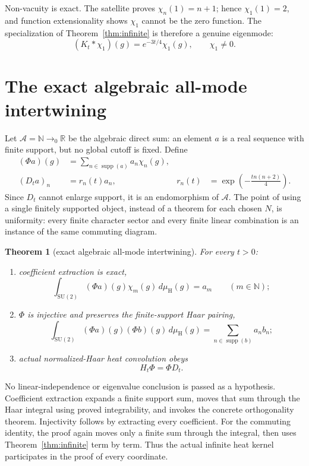 \documentclass[11pt]{article}
\newtheorem{theorem}{Theorem}[section]
\theoremstyle{definition}
\theoremstyle{remark}
\newcommand{\SU}{\mathrm{SU}(2)}
\newcommand{\Haar}{\mu_{\mathrm H}}
\begin{document}
Non-vacuity is exact.  The satellite proves $\chi_n(1)=n+1$; hence
$\chi_1(1)=2$, and function extensionality shows $\chi_1$ cannot be the zero
function.  The specialization of Theorem~\ref{thm:infinite} is therefore a
genuine eigenmode:
\begin{equation}\label{eq:fundamental}
  (K_t*\chi_1)(g)=e^{-3t/4}\chi_1(g),\qquad \chi_1\ne0.
\end{equation}

\section{The exact algebraic all-mode intertwining}\label{sec:intertwining}

Let $\mathcal A=\mathbb N\to_0\mathbb R$ be the algebraic direct sum: an
element $a$ is a real sequence with finite support, but no global cutoff is
fixed.  Define
\begin{align*}
  (\Phi a)(g)&=\sum_{n\in\operatorname{supp}(a)}a_n\chi_n(g),\\
  (D_ta)_n&=r_n(t)a_n,
  &r_n(t)&=\exp\!\left(-\frac{t n(n+2)}4\right).
\end{align*}
Since $D_t$ cannot enlarge support, it is an endomorphism of $\mathcal A$.
The point of using a single finitely supported object, instead of a theorem
for each chosen $N$, is uniformity: every finite character sector and every
finite linear combination is an instance of the same commuting diagram.

\begin{theorem}[exact algebraic all-mode intertwining]\label{thm:allmodes}
For every $t>0$:
\begin{enumerate}[label=(\alph*)]
\item coefficient extraction is exact,
\[
 \int_{\SU}(\Phi a)(g)\chi_m(g)\,d\Haar(g)=a_m
 \qquad(m\in\mathbb N);
\]
\item $\Phi$ is injective and preserves the finite-support Haar pairing,
\[
 \int_{\SU}(\Phi a)(g)(\Phi b)(g)\,d\Haar(g)
   =\sum_{n\in\operatorname{supp}(b)}a_nb_n;
\]
\item actual normalized-Haar heat convolution obeys
\[
 H_t\Phi=\Phi D_t.
\]
\end{enumerate}
\end{theorem}

No linear-independence or eigenvalue conclusion is passed as a hypothesis.
Coefficient extraction expands a finite support sum, moves that sum through
the Haar integral using proved integrability, and invokes the concrete
orthogonality theorem.  Injectivity follows by extracting every coefficient.
For the commuting identity, the proof again moves only a finite sum through
the integral, then uses Theorem~\ref{thm:infinite} term by term.  Thus the
actual infinite heat kernel participates in the proof of every coordinate.
\end{document}
